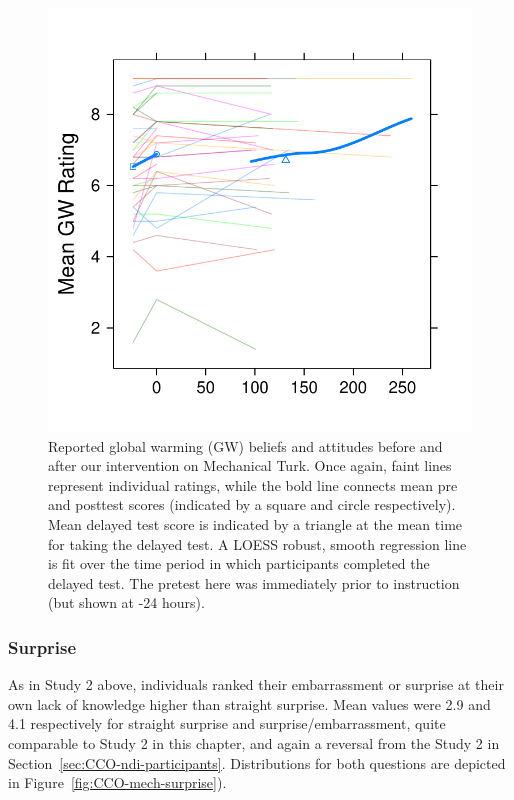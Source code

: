 \begin{figure}
    \centering
    \includegraphics{CCO-mech-GW.pdf}
    \caption{Reported global warming (GW) beliefs and attitudes before and after
        our intervention on Mechanical Turk. Once again, faint lines represent
        individual ratings, while the bold line connects mean pre and posttest
        scores (indicated by a square and circle respectively).  Mean delayed
        test score is indicated by a triangle at the mean time for taking the
        delayed test. A LOESS robust, smooth regression line is fit over the
        time period in which participants completed the delayed test. The
        pretest here was immediately prior to instruction (but shown at -24
        hours).}
    \label{fig:CCO-mech-GW}
\end{figure}


\subsubsection{Surprise}

As in Study 2 above, individuals ranked their embarrassment or surprise at their own
lack of knowledge higher than straight surprise. Mean values were 2.9 and 4.1
respectively for straight surprise and surprise/embarrassment, quite comparable
to Study 2 in this chapter, and again a reversal from the Study 2 in
Section~\ref{sec:CCO-ndi-participants}. Distributions for both questions are depicted in
Figure~\ref{fig:CCO-mech-surprise}). 

